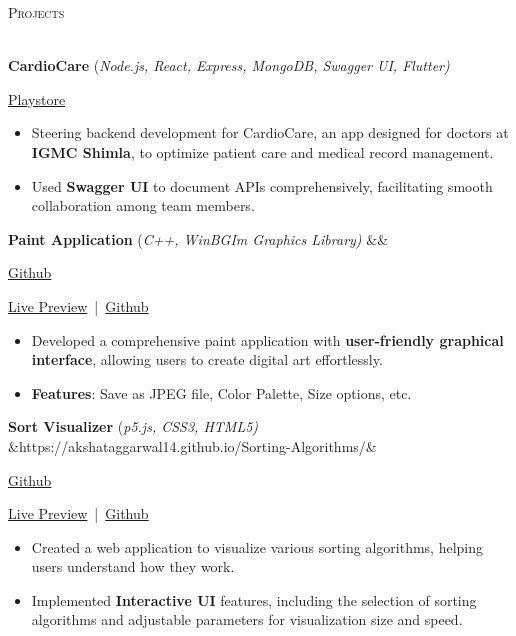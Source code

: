 \documentclass[a4paper]{article}
\newcommand{\bulletSep} { \vspace{2mm} }
\newcommand{\sectionSep} { \vspace{3mm} }
\newcommand{\lineunder} {
    \vspace*{-8pt} \\
    \hspace*{-15pt} \hrulefill \\
}
\newcommand{\header} [1] {
    {\hspace*{-18pt}\vspace*{6pt} {
        \fontfamily{qcs}\selectfont \large \scshape #1
    }}
    \vspace*{-6pt} \lineunder
    \vspace{1.1mm}
}
\newcommand{\linkFont}[1]{
    {\fontfamily{lmtt}\selectfont#1}
}
\newcommand{\link}[2]{
    {\fontfamily{lmtt}\selectfont\href{#1}{#2}}
}
\newcommand{\projectItem}[5]{
    {\textbf{#1}} {(\sl #2)}\hfill
    \ifx&#3&%
    \link{#4}{Github}\\
    \else
    \linkFont{\href{#3}{Live Preview}~|~\href{#4}{Github}}\\
    \fi
    \vspace{2pt}
    \begin{itemize}
        #5
    \end{itemize}
}
\newcommand{\playstoreProjectItem}[4]{
    {\textbf{#1}} {(\sl #2)}\hfill
    \linkFont{\href{#3}{Playstore}}\\
    \vspace{2pt}
    \begin{itemize}
        #4
    \end{itemize}
}
\begin{document}

\header{Projects}

\playstoreProjectItem{CardioCare}{Node.js, React, Express, MongoDB, Swagger UI, Flutter}{https://play.google.com/store/apps/details?id=com.cardio.care}{
    \item Steering backend development for CardioCare, an app designed for doctors at \textbf{IGMC Shimla}, to optimize patient care and medical record management.
    \item Used \textbf{Swagger UI} to document APIs comprehensively, facilitating smooth collaboration among team members.
}
\bulletSep


\projectItem{Paint Application}{C++, WinBGIm Graphics Library}{}{https://github.com/Sahil-187/Paint-Application}{
    \item Developed a comprehensive paint application with \textbf{user-friendly graphical interface}, allowing users to create digital art effortlessly.
    \item \textbf{Features}: Save as JPEG file, Color Palette, Size options, etc.
}
\bulletSep

\projectItem{Sort Visualizer}{p5.js, CSS3, HTML5}{https://akshataggarwal14.github.io/Sorting-Algorithms/}{https://github.com/AkshatAggarwal14/Sorting-Algorithms/}{
    \item Created a web application to visualize various sorting algorithms, helping users understand how they work.
    \item Implemented \textbf{Interactive UI} features, including the selection of sorting algorithms and adjustable parameters for visualization size and speed.
}

\sectionSep
\end{document}
